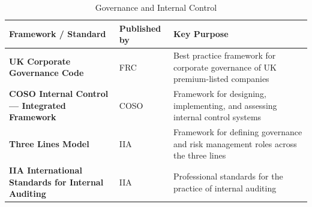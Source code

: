 \begin{table}[H]
  \centering
  \renewcommand{\arraystretch}{1.5}
  \begin{tabularx}{\textwidth}{ | >{\raggedright\arraybackslash}p{} 
								| >{\raggedright\arraybackslash}p{} 
                                | >{\raggedright\arraybackslash}X | }
    \hline
    \textbf{Framework / Standard} & \textbf{Published by} & \textbf{Key Purpose} \\
    \hline
    \textbf{UK Corporate Governance Code} & FRC & Best practice framework for corporate governance of UK premium-listed companies\\
    \hline
    \textbf{COSO Internal Control — Integrated Framework} & COSO & Framework for designing, implementing, and assessing internal control systems\\
    \hline
    \textbf{Three Lines Model} & IIA & Framework for defining governance and risk management roles across the three lines\\
    \hline
    \textbf{IIA International Standards for Internal Auditing} & IIA & Professional standards for the practice of internal auditing\\
    \hline
  \end{tabularx}
  \caption{Governance and Internal Control}
\end{table}
